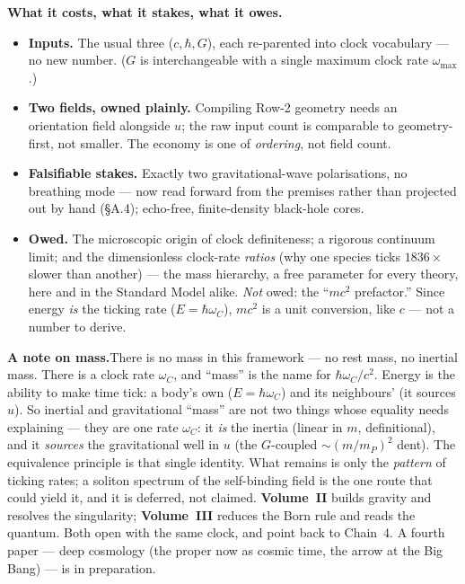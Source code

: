 \documentclass[11pt]{article}
\begin{document}
\textbf{What it costs, what it stakes, what it owes.}
\begin{itemize}[leftmargin=1.5em,itemsep=2pt,topsep=3pt]
  \item \textbf{Inputs.} The usual three ($c,\hbar,G$), each re-parented into clock vocabulary --- no
    new number. ($G$ is interchangeable with a single maximum clock rate $\omega_{\max}$.)
  \item \textbf{Two fields, owned plainly.} Compiling Row-2 geometry needs an orientation field
    alongside $u$; the raw input count is comparable to geometry-first, not smaller. The economy is
    one of \emph{ordering}, not field count.
  \item \textbf{Falsifiable stakes.} Exactly two gravitational-wave polarisations, no breathing mode ---
    now read forward from the premises rather than projected out by hand (\S A.4); echo-free,
    finite-density black-hole cores.
  \item \textbf{Owed.} The microscopic origin of clock definiteness; a
    rigorous continuum limit; and the dimensionless clock-rate \emph{ratios} (why one species ticks
    $1836\times$ slower than another) --- the mass hierarchy, a free parameter for every theory, here and
    in the Standard Model alike. \emph{Not} owed: the ``$mc^2$ prefactor.'' Since energy \emph{is} the
    ticking rate ($E=\hbar\omega_C$), $mc^2$ is a unit conversion, like $c$ --- not a number to derive.
\end{itemize}
\noindent\textbf{A note on mass.}\enspace There is no mass in this framework --- no rest mass, no
inertial mass. There is a clock rate $\omega_C$, and ``mass'' is the name for $\hbar\omega_C/c^2$.
Energy is the ability to make time tick: a body's own ($E=\hbar\omega_C$) and its neighbours'
(it sources $u$). So inertial and gravitational ``mass'' are not two things whose equality needs
explaining --- they are one rate $\omega_C$: it \emph{is} the inertia (linear in $m$, definitional), and
it \emph{sources} the gravitational well in $u$ (the $G$-coupled $\sim(m/m_P)^2$ dent). The equivalence
principle is that single identity. What remains is only the \emph{pattern} of ticking rates; a soliton
spectrum of the self-binding field is the one route that could yield it, and it is deferred, not claimed.
\noindent \textbf{Volume~II} builds gravity and resolves the singularity; \textbf{Volume~III} reduces
the Born rule and reads the quantum. Both open with the same clock, and point back to Chain~4. A fourth
paper --- deep cosmology (the proper now as cosmic time, the arrow at the Big Bang) --- is in preparation.
\end{document}
